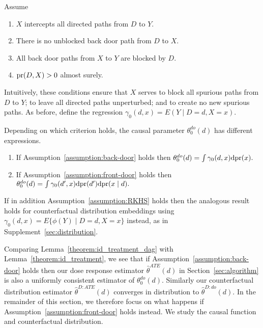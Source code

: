 \begin{assumption}\label{assumption:front-door}
Assume
\begin{enumerate}
    \item $X$ intercepts all directed paths from $D$ to $Y$.
    \item There is no unblocked back door path from $D$ to $X$.
    \item All back door paths from $X$ to $Y$ are blocked by $D$.
    \item $\text{\normalfont pr}(D,X)>0$ almost surely.
\end{enumerate}
\end{assumption}
Intuitively, these conditions ensure that $X$ serves to block all spurious paths from $D$ to $Y$; to leave all directed paths unperturbed; and to create no new spurious paths. As before, define the regression
$
\gamma_0(d,x)=E(Y \mid D=d,X=x)
$.
\begin{lemma}\label{theorem:id_treatment_dag}
Depending on which criterion holds, the causal parameter $\theta_0^{do}(d)$ has different expressions.
\begin{enumerate}
    \item If Assumption~\ref{assumption:back-door} holds then
$
\theta_0^{do}(d)=\int \gamma_0(d,x)\mathrm{d}\text{\normalfont pr}(x).
$
    \item If Assumption~\ref{assumption:front-door} holds then
$
\theta_0^{do}(d)=\int \gamma_0(d',x)\mathrm{d}\text{\normalfont pr}(d')\mathrm{d}\text{\normalfont pr}(x \mid d).
$
\end{enumerate}
If in addition Assumption~\ref{assumption:RKHS} holds then the analogous result holds for counterfactual distribution embeddings using $\gamma_0(d,x)=E\{\phi(Y) \mid D=d,X=x\}$ instead, as in Supplement~\ref{sec:distribution}.
\end{lemma}

Comparing Lemma~\ref{theorem:id_treatment_dag} with Lemma~\ref{theorem:id_treatment}, we see that if Assumption~\ref{assumption:back-door} holds then
our dose response estimator $\hat{\theta}^{ATE}(d)$ in Section~\ref{sec:algorithm} is also a uniformly consistent estimator of $\theta_0^{do}(d)$. Similarly our counterfactual distribution estimator $\hat{\theta}^{D:ATE}(d)$ converges in distribution to $\hat{\theta}^{D:do}(d)$. In the remainder of this section, we therefore focus on what happens if Assumption~\ref{assumption:front-door} holds instead. We study the causal function and counterfactual distribution.


